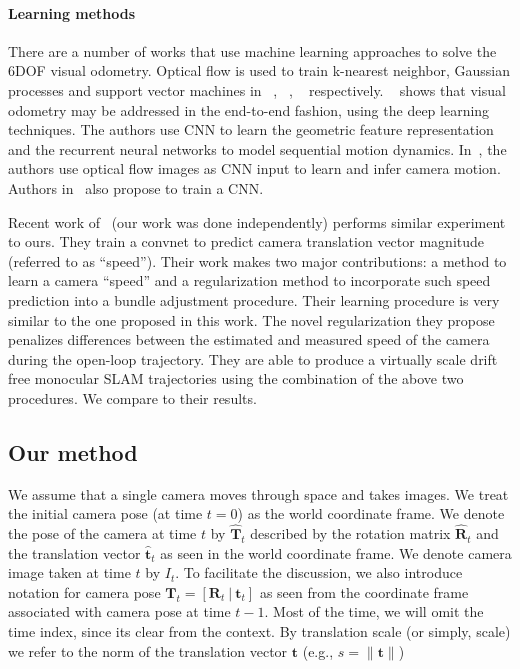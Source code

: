 \paragraph{Learning methods} There are a number of works that use
machine learning approaches to solve the 6DOF visual odometry.
Optical flow is used to train k-nearest neighbor, Gaussian processes
and support vector machines in ~\cite{roberts2008memory},
~\cite{guizilini2013semi}, ~\cite{CIARFUGLIA20141717}
respectively. ~\cite{wang2017deepvo} shows that visual odometry may be
addressed in the end-to-end fashion, using the deep learning
techniques. The authors use CNN to learn the geometric feature
representation and the recurrent neural networks to model sequential
motion dynamics. In~\cite{muller2017flowdometry}, the authors use
optical flow images as CNN input to learn and infer camera
motion. Authors in~\cite{DBLP:journals/corr/MohantyADGSC16} also
propose to train a CNN.

Recent work of~\cite{frost2017using} (our work was done independently)
performs similar experiment to ours.  They train a convnet to predict
camera translation vector magnitude (referred to as ``speed'').  Their
work makes two major contributions: a method to learn a camera
``speed'' and a regularization method to incorporate such speed
prediction into a bundle adjustment procedure.  Their learning
procedure is very similar to the one proposed in this work.  The novel
regularization they propose penalizes differences between the
estimated and measured speed of the camera during the open-loop
trajectory. They are able to produce a virtually scale drift free
monocular SLAM trajectories using the combination of the above two
procedures.  We compare to their results.

\subsection{Our method}\label{sec:our method}

We assume that a single camera moves through space and takes images.
We treat the initial camera pose (at time $t=0$) as the world
coordinate frame.  We denote the pose of the camera at time $t$ by
$\mathbf{\hat{T}}_t$ described by the rotation matrix
$\mathbf{\hat{R}}_t$ and the translation vector $\mathbf{\hat{t}}_t$
as seen in the world coordinate frame.  We denote camera image taken
at time $t$ by $I_t$.  To facilitate the discussion, we also introduce
notation for camera pose
$\mathbf{T}_t = [\mathbf{R}_t\ |\ \mathbf{t}_t] $ as seen from the
coordinate frame associated with camera pose at time $t-1$.  Most of
the time, we will omit the time index, since its clear from the
context.  By translation scale (or simply, scale) we refer to the norm
of the translation vector $\mathbf{t}$ (e.g.,
$s = \lVert \mathbf{t} \rVert$)


